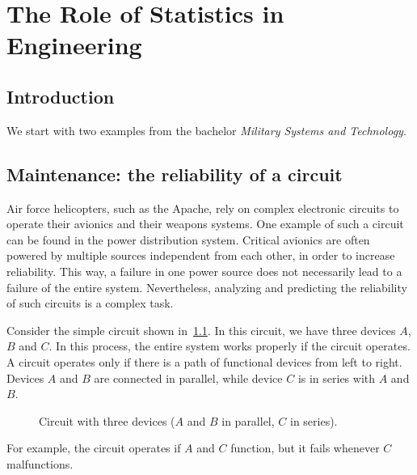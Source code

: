 \chapter{The Role of Statistics in Engineering}

\section{Introduction}
We start with two examples from the bachelor \emph{Military Systems and Technology}.

\section{Maintenance: the reliability of a circuit}
Air force helicopters, such as the Apache, rely on complex electronic circuits to operate their avionics and their weapons systems.
One example of such a circuit can be found in the power distribution system.
Critical avionics are often powered by multiple sources independent from each other, in order to increase reliability.
This way, a failure in one power source does not necessarily lead to a failure of the entire system.
Nevertheless, analyzing and predicting the reliability of such circuits is a complex task.

Consider the simple circuit shown in~\cref{fig:circuit}. In this circuit, we have three devices $A$, $B$ and $C$.
In this process, the entire system works properly if the circuit operates.
A circuit operates only if there is a path of functional devices from left to right.
Devices $A$ and $B$ are connected in parallel, while device $C$ is in series with $A$ and $B$.

\begin{figure}[htbp]
  \centering
  \caption{Circuit with three devices ($A$ and $B$ in parallel, $C$ in series).}
  \label{fig:circuit}
\end{figure}

For example, the circuit operates if $A$ and $C$ function, but it fails whenever $C$ malfunctions.

